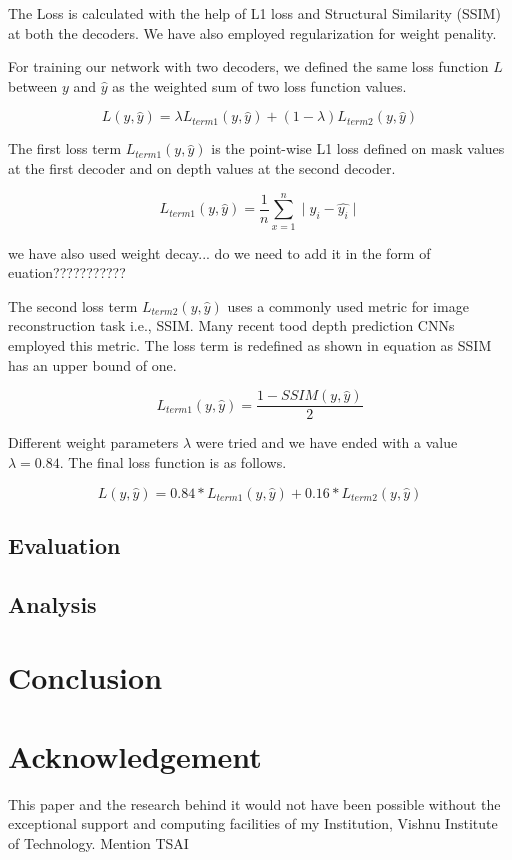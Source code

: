 \documentclass[review]{cvpr}
\begin{document}
The Loss is calculated with the help of L1 loss and Structural Similarity (SSIM) at both the decoders. 
We have also employed regularization for weight penality.

For training our network with two decoders, we defined the same loss function $L$ between $y$ and $\hat{y}$ as the weighted sum of 
two loss function values.

\begin{equation}
L(y, \hat{y}) = \lambda L_{term1}(y, \hat{y}) + (1 - \lambda) L_{term2}(y, \hat{y})
\end{equation}

The first loss term $L_{term1}(y, \hat{y})$ is the point-wise L1 loss defined on mask values at the first decoder and 
on depth values at the second decoder.

\begin{equation}
L_{term1}(y, \hat{y}) = \frac{1}{n} \sum_{x=1}^{n} \mid y_i - \hat{y_i} \mid
\end{equation}

we have also used weight decay... do we need to add it in the form of euation???????????

The second loss term $L_{term2}(y, \hat{y})$ uses a commonly used metric for image reconstruction task i.e., SSIM. 
Many recent tood depth prediction CNNs employed this metric. 
The loss term is redefined as shown in equation as SSIM has an upper bound of one.

\begin{equation}
L_{term1}(y, \hat{y}) = \frac{1 - SSIM(y, \hat{y})}{2}
\end{equation}

Different weight parameters $\lambda$ were tried and we have ended with a value $\lambda = 0.84$. The final loss function is as follows.

\begin{equation}
L(y, \hat{y}) = 0.84 \ast L_{term1}(y, \hat{y}) + 0.16 \ast L_{term2}(y, \hat{y})
\end{equation}

\subsection{Evaluation}
\subsection{Analysis}
\section{Conclusion}
\section{Acknowledgement}
This paper and the research behind it would not have been possible without the exceptional support and computing facilities of my Institution, Vishnu Institute of Technology. Mention TSAI

{\small


}
\end{document}
